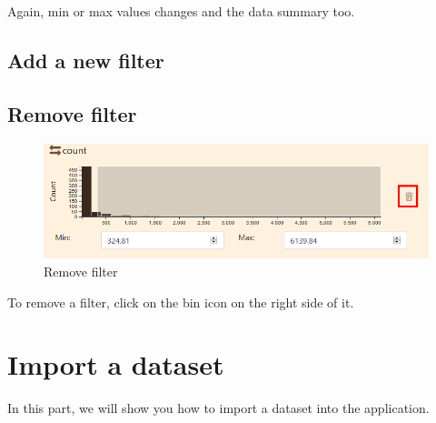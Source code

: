 \documentclass[]{book}
\begin{document}
Again, min or max values changes and the data summary too.

\hypertarget{add-a-new-filter}{%
\section{Add a new filter}\label{add-a-new-filter}}

\hypertarget{remove-filter}{%
\section{Remove filter}\label{remove-filter}}

\begin{figure}
\centering
\includegraphics{images/functions/data_panel/02_data_panel_remove_filter.png}
\caption{Remove filter}
\end{figure}

To remove a filter, click on the bin icon on the right side of it.

\hypertarget{import-a-dataset}{%
\chapter{Import a dataset}\label{import-a-dataset}}

In this part, we will show you how to import a dataset into the application.


\end{document}
